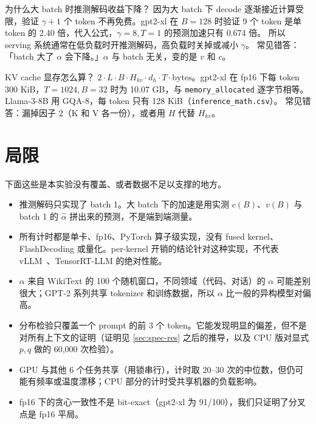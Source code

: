 \documentclass[11pt,a4paper]{ctexart}
\begin{document}
\begin{iqbox}{为什么大 batch 时推测解码收益下降？}
因为大 batch 下 decode 逐渐接近计算受限，验证 $\gamma{+}1$ 个 token 不再免费。gpt2-xl 在 $B{=}128$ 时验证 9 个 token 是单 token 的 2.40 倍，代入公式，$\gamma{=}8,T{=}1$ 的预测加速只有 0.674 倍。
所以 serving 系统通常在低负载时开推测解码，高负载时关掉或减小 $\gamma$。
\tcblower
常见错答：「batch 大了 $\alpha$ 会下降。」$\alpha$ 与 batch 无关，变的是 $v$ 和 $c$。
\end{iqbox}

\begin{iqbox}{KV cache 显存怎么算？}
$2\cdot L\cdot B\cdot H_{kv}\cdot d_h\cdot T\cdot\text{bytes}$。gpt2-xl 在 fp16 下每 token 300 KiB，$T{=}1024,B{=}32$ 时为 10.07 GB，与 \texttt{memory\_allocated} 逐字节相等。
Llama-3-8B 用 GQA-8，每 token 只有 128 KiB（\texttt{inference\_math.csv}）。
\tcblower
常见错答：漏掉因子 2（K 和 V 各一份），或者用 $H$ 代替 $H_{kv}$。
\end{iqbox}

\section{局限}

下面这些是本实验没有覆盖、或者数据不足以支撑的地方。

\begin{caveatbox}
\begin{itemize}
  \item 推测解码只实现了 batch 1。大 batch 下的加速是用实测 $c(B)$、$v(B)$ 与 batch 1 的 $\hat\alpha$ 拼出来的预测，不是端到端测量。
  \item 所有计时都是单卡、fp16、PyTorch 算子级实现，没有 fused kernel、FlashDecoding 或量化。per-kernel 开销的结论针对这种实现，不代表 vLLM~\cite{vllm}、TensorRT-LLM 的绝对性能。
  \item $\alpha$ 来自 WikiText 的 100 个随机窗口，不同领域（代码、对话）的 $\alpha$ 可能差别很大；GPT-2 系列共享 tokenizer 和训练数据，所以 $\alpha$ 比一般的异构模型对偏高。
  \item 分布检验只覆盖一个 prompt 的前 3 个 token。它能发现明显的偏差，但不是对所有上下文的证明（证明见 \cref{sec:spec-res} 之后的推导，以及 CPU 版对显式 $p,q$ 做的 60{,}000 次检验）。
  \item GPU 与其他 6 个任务共享（用锁串行），计时取 20--30 次的中位数，但仍可能有频率或温度漂移；CPU 部分的计时受共享机器的负载影响。
  \item fp16 下的贪心一致性不是 bit-exact（gpt2-xl 为 91/100），我们只证明了分叉点是 fp16 平局。
\end{itemize}
\end{caveatbox}
\end{document}
